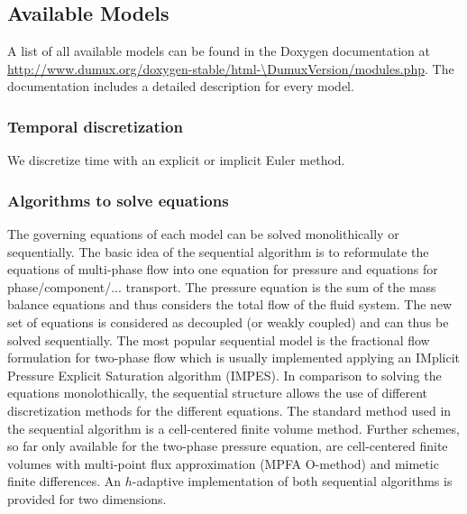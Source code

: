 \subsection{Available Models}
A list of all available models can be found
in the Doxygen documentation at
\url{http://www.dumux.org/doxygen-stable/html-\DumuxVersion/modules.php}.
The documentation includes a detailed description for every model.

\subsubsection{Temporal discretization}
We discretize time with an explicit or implicit Euler
method.

\subsubsection{Algorithms to solve equations}
The governing equations of each model can be solved monolithically or sequentially.
The basic idea of the sequential algorithm is to reformulate the
equations of multi-phase flow into one equation for
pressure and equations for phase/component/... transport. The pressure equation
is the sum of the mass balance equations and thus considers the total flow of the
fluid system. The new set of equations is considered as decoupled (or weakly coupled)
and can thus be solved sequentially. The most popular sequential model is the
fractional flow formulation for two-phase flow which is usually implemented applying
an IMplicit Pressure Explicit Saturation algorithm (IMPES).
In comparison to solving the equations monolothically, the sequential structure allows the use of
different discretization methods for the different equations. The standard method
used in the sequential algorithm is a cell-centered finite volume method. Further schemes,
so far only available for the two-phase pressure equation, are cell-centered finite
volumes with multi-point flux approximation (MPFA O-method) and mimetic finite differences.
An $h$-adaptive implementation of both sequential algorithms is provided for two dimensions.
